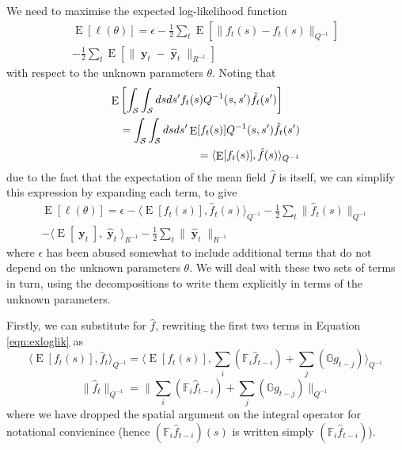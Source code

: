 \documentclass{IEEEtran}
\newcommand{\inner}[3]{\langle#1,#2\rangle_{#3}}
\newcommand{\dist}[2]{\|#1\|_{#2}}
\DeclareMathOperator{\E}{E}
\DeclareMathOperator{\yvec}{\mathbf{y}}
\begin{document}
We need to maximise the expected log-likelihood function
\begin{equation}
	\label{eqn:exploglik}
	\begin{split}
	\E[\ell(\theta)] = \epsilon - \frac{1}{2}\sum_t\E[\dist{f_t(s) - \hat{f}_t(s)}{Q^{-1}}]  \\
	- \frac{1}{2}\sum_t\E[\dist{\yvec_t-\hat{\yvec}_t}{R^{-1}}]
	\end{split}
\end{equation}
with respect to the unknown parameters $\theta$. Noting that 
\begin{eqnarray}
	\lefteqn{\E\left[\int_\mathcal{S}\int_\mathcal{S}ds ds' f_t(s) Q^{-1}(s,s') \hat{f}_t(s')\right] } \nonumber \\ 
		&& = \int_\mathcal{S}\int_\mathcal{S}ds ds' \E[f_t(s)] Q^{-1}(s,s') \hat{f}_t(s') \\
		&& = \inner{\E[f_t(s)]}{\hat{f}(s)}{Q^{-1}}
\end{eqnarray}
due to the fact that the expectation of the mean field $\hat{f}$ is itself, we can simplify this expression by expanding each term, to give
\begin{equation}
	\begin{split}
	\label{eqn:exloglik}
	\E[\ell(\theta)] = \epsilon
	- \inner{\E[f_t(s)]}{\hat{f}_t(s)}{Q^{-1}}
	- \frac{1}{2}\sum_t \dist{\hat{f}_t(s)}{Q^{-1}} \\
	- \inner{\E[\yvec_t]}{\hat{\yvec}_t}{R^{-1}}
	- \frac{1}{2}\sum_t \dist{\hat{\yvec}_t}{R^{-1}}
	\end{split}
\end{equation}
where $\epsilon$ has been abused somewhat to include additional terms that do not depend on the unknown parameters $\theta$. We will deal with these two sets of terms in turn, using the decompositions to write them explicitly in terms of the unknown parameters.

Firstly, we can substitute for $\hat{f}$, rewriting the first two terms in Equation \ref{eqn:exloglik} as
\begin{equation}
	\label{eqn:Eff}
	\inner{\E[f_t(s)]}{\hat{f}_t}{Q^{-1}} = \inner{\E[f_t(s)]}{\sum_i(\mathbb{F}_i\hat{f}_{t-i}) + \sum_j(\mathbb{G}g_{t-j})}{Q^{-1}}
\end{equation}
\begin{equation}
	\label{eqn:fhat}
	\dist{\hat{f}_t}{Q^{-1}} = \dist{\sum_i(\mathbb{F}_i\hat{f}_{t-i}) + \sum_j(\mathbb{G}g_{t-j})}{Q^{-1}}
\end{equation}
where we have dropped the spatial argument on the integral operator for notational convienince (hence $(\mathbb{F}_i\hat{f}_{t-i})(s)$ is written simply $(\mathbb{F}_i\hat{f}_{t-i})$). 
\end{document}
